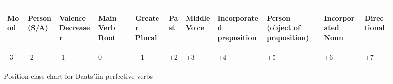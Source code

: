 \documentclass[output=paper]{langsci/langscibook}
\begin{document}
\begin{figure}
\begin{tabularx}{\textwidth}{XXXXXXXXXXp{2cm}}
\begin{turn}{33} Mood \end{turn} & \begin{turn}{33} Person (S/A) \end{turn} & \begin{turn}{33} Valence Decreaser \end{turn} & \begin{turn}{33} Main Verb Root \end{turn} & \begin{turn}{33} Greater Plural \end{turn} & \begin{turn}{33} Past \end{turn} & \begin{turn}{33} Middle Voice \end{turn} & \begin{turn}{33} Incorporated preposition \end{turn} & \begin{turn}{33} Person (object of preposition) \end{turn} & \begin{turn}{33} Incorporated Noun \end{turn} & \begin{turn}{33} Directional \end{turn} \\
\midrule
\multicolumn{1}{X}{{}-3} & \multicolumn{1}{X}{{}-2} & \multicolumn{1}{X}{{}-1} & \multicolumn{1}{X}{0} & \multicolumn{1}{X}{+1} & \multicolumn{1}{X}{+2} & \multicolumn{1}{X}{+3} & \multicolumn{1}{X}{+4} & \multicolumn{1}{X}{+5} & \multicolumn{1}{X}{+6} & +7\\
\end{tabularx}
\caption{Position class chart for Daatsʼíin perfective verbs}
\label{fig:ahlandc:2}
\end{figure}
\end{document}
